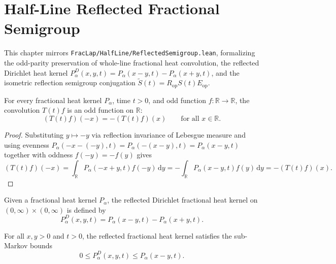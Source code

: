 \chapter{Half-Line Reflected Fractional Semigroup}

This chapter mirrors \texttt{FracLap/HalfLine/ReflectedSemigroup.lean}, formalizing the odd-parity preservation of whole-line fractional heat convolution, the reflected Dirichlet heat kernel $P_\alpha^D(x, y, t) = P_\alpha(x - y, t) - P_\alpha(x + y, t)$, and the isometric reflection semigroup conjugation $\widetilde{S}(t) = R_{\mathrm{op}} S(t) E_{\mathrm{op}}$.

\begin{theorem}\label{thm:conv_preserves_odd}
\leanok
For every fractional heat kernel $P_\alpha$, time $t > 0$, and odd function $f : \mathbb{R} \to \mathbb{R}$, the convolution $T(t)f$ is an odd function on $\mathbb{R}$:
\[
  (T(t)f)(-x) = -(T(t)f)(x) \qquad \text{for all } x \in \mathbb{R}.
\]
\end{theorem}

\begin{proof}
\leanok
Substituting $y \mapsto -y$ via reflection invariance of Lebesgue measure and using evenness $P_\alpha(-x - (-y), t) = P_\alpha(-(x - y), t) = P_\alpha(x - y, t)$ together with oddness $f(-y) = -f(y)$ gives
\[
  (T(t)f)(-x) = \int_{\mathbb{R}} P_\alpha(-x + y, t) f(-y)\, \mathrm{d}y = -\int_{\mathbb{R}} P_\alpha(x - y, t) f(y)\, \mathrm{d}y = -(T(t)f)(x).
\]
\end{proof}

\begin{definition}\label{def:reflected_heat_kernel}
\leanok
Given a fractional heat kernel $P_\alpha$, the reflected Dirichlet fractional heat kernel on $(0, \infty) \times (0, \infty)$ is defined by
\[
  P_\alpha^D(x, y, t) = P_\alpha(x - y, t) - P_\alpha(x + y, t).
\]
\end{definition}

\begin{theorem}\label{thm:reflected_heat_kernel_bounds}
\leanok
For all $x, y > 0$ and $t > 0$, the reflected fractional heat kernel satisfies the sub-Markov bounds
\[
  0 \le P_\alpha^D(x, y, t) \le P_\alpha(x - y, t).
\]
\end{theorem}

